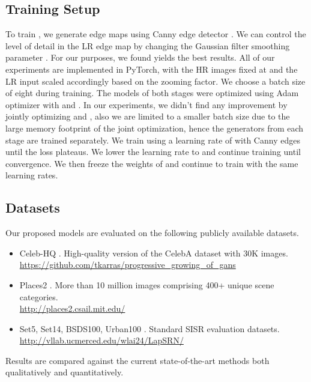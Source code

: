 \documentclass[10pt,twocolumn,letterpaper]{article}
\begin{document}
\subsection{Training Setup}
To train , we generate edge maps using Canny edge detector \cite{canny1986computational}. We can control the level of detail in the LR edge map by changing the Gaussian filter smoothing parameter . For our purposes, we found  yields the best results. All of our experiments are implemented in PyTorch, with the HR images fixed at  and the LR input scaled accordingly based on the zooming factor. We choose a batch size of eight during training. The models of both stages were optimized using Adam optimizer \cite{kingma2014adam} with  and . In our experiments, we didn't find any improvement by jointly optimizing  and , also we are limited to a smaller batch size due to the large memory footprint of the joint optimization, hence the generators from each stage are trained separately. We train  using a learning rate of  with Canny edges until the loss plateaus. We lower the learning rate to  and continue training until convergence. We then freeze the weights of  and continue to train  with the same learning rates.

\subsection{Datasets}
Our proposed models are evaluated on the following publicly available datasets. 

\begin{itemize}
	\item Celeb-HQ \cite{karras2018progressive}. High-quality version of the CelebA dataset with 30K images. \\ \url{https://github.com/tkarras/progressive_growing_of_gans}
	
	\item Places2 \cite{zhou2017places}. More than 10 million images comprising 400+ unique scene categories. \\ \url{http://places2.csail.mit.edu/}
	
	\item Set5, Set14, BSDS100, Urban100 \cite{huang2015single}. Standard SISR evaluation datasets. \\ \url{http://vllab.ucmerced.edu/wlai24/LapSRN/}
\end{itemize}
\noindent
Results are compared against the current state-of-the-art methods both qualitatively and quantitatively.
\end{document}
